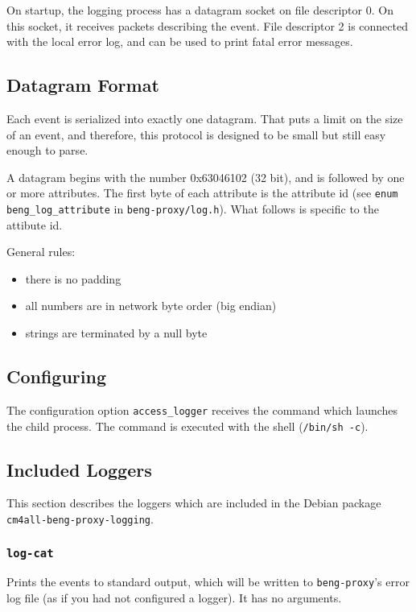\documentclass[a4paper,12pt]{article}
\begin{document}
On startup, the logging process has a datagram socket on file
descriptor 0.  On this socket, it receives packets describing the
event.  File descriptor 2 is connected with the local error log, and
can be used to print fatal error messages.

\subsection{Datagram Format}

Each event is serialized into exactly one datagram.  That puts a limit
on the size of an event, and therefore, this protocol is designed to
be small but still easy enough to parse.

A datagram begins with the number 0x63046102 (32 bit), and is followed
by one or more attributes.  The first byte of each attribute is the
attribute id (see \texttt{enum beng\_log\_attribute} in
\texttt{beng-proxy/log.h}).  What follows is specific to the attibute
id.

General rules:

\begin{itemize}
\item there is no padding
\item all numbers are in network byte order (big endian)
\item strings are terminated by a null byte
\end{itemize}

\subsection{Configuring}

The configuration option \verb|access_logger| receives the command
which launches the child process.  The command is executed with the
shell (\texttt{/bin/sh -c}).

\subsection{Included Loggers}

This section describes the loggers which are included in the Debian
package \texttt{cm4all-beng-proxy-logging}.

\subsubsection{\texttt{log-cat}}

Prints the events to standard output, which will be written to
\texttt{beng-proxy}'s error log file (as if you had not configured a
logger).  It has no arguments.
\end{document}
